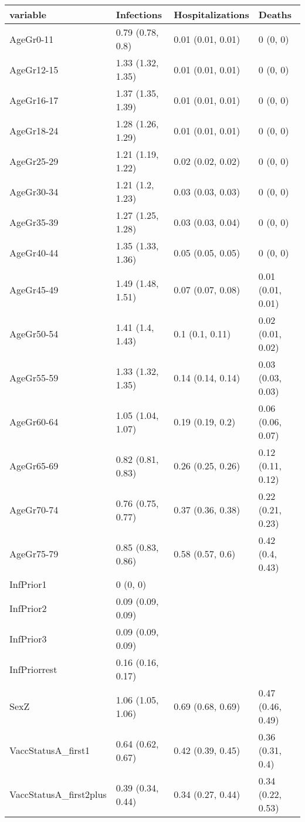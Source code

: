 \begin{table}[ht]
\centering
\begin{tabular}{llll}
  \hline
variable & Infections & Hospitalizations & Deaths \\ 
  \hline
AgeGr0-11 & 0.79 (0.78, 0.8) & 0.01 (0.01, 0.01) & 0 (0, 0) \\ 
  AgeGr12-15 & 1.33 (1.32, 1.35) & 0.01 (0.01, 0.01) & 0 (0, 0) \\ 
  AgeGr16-17 & 1.37 (1.35, 1.39) & 0.01 (0.01, 0.01) & 0 (0, 0) \\ 
  AgeGr18-24 & 1.28 (1.26, 1.29) & 0.01 (0.01, 0.01) & 0 (0, 0) \\ 
  AgeGr25-29 & 1.21 (1.19, 1.22) & 0.02 (0.02, 0.02) & 0 (0, 0) \\ 
  AgeGr30-34 & 1.21 (1.2, 1.23) & 0.03 (0.03, 0.03) & 0 (0, 0) \\ 
  AgeGr35-39 & 1.27 (1.25, 1.28) & 0.03 (0.03, 0.04) & 0 (0, 0) \\ 
  AgeGr40-44 & 1.35 (1.33, 1.36) & 0.05 (0.05, 0.05) & 0 (0, 0) \\ 
  AgeGr45-49 & 1.49 (1.48, 1.51) & 0.07 (0.07, 0.08) & 0.01 (0.01, 0.01) \\ 
  AgeGr50-54 & 1.41 (1.4, 1.43) & 0.1 (0.1, 0.11) & 0.02 (0.01, 0.02) \\ 
  AgeGr55-59 & 1.33 (1.32, 1.35) & 0.14 (0.14, 0.14) & 0.03 (0.03, 0.03) \\ 
  AgeGr60-64 & 1.05 (1.04, 1.07) & 0.19 (0.19, 0.2) & 0.06 (0.06, 0.07) \\ 
  AgeGr65-69 & 0.82 (0.81, 0.83) & 0.26 (0.25, 0.26) & 0.12 (0.11, 0.12) \\ 
  AgeGr70-74 & 0.76 (0.75, 0.77) & 0.37 (0.36, 0.38) & 0.22 (0.21, 0.23) \\ 
  AgeGr75-79 & 0.85 (0.83, 0.86) & 0.58 (0.57, 0.6) & 0.42 (0.4, 0.43) \\ 
  InfPrior1 & 0 (0, 0) &  &  \\ 
  InfPrior2 & 0.09 (0.09, 0.09) &  &  \\ 
  InfPrior3 & 0.09 (0.09, 0.09) &  &  \\ 
  InfPriorrest & 0.16 (0.16, 0.17) &  &  \\ 
  SexZ & 1.06 (1.05, 1.06) & 0.69 (0.68, 0.69) & 0.47 (0.46, 0.49) \\ 
  VaccStatusA\_first1 & 0.64 (0.62, 0.67) & 0.42 (0.39, 0.45) & 0.36 (0.31, 0.4) \\ 
  VaccStatusA\_first2plus & 0.39 (0.34, 0.44) & 0.34 (0.27, 0.44) & 0.34 (0.22, 0.53) \\ 

\end{tabular}
\end{table}
